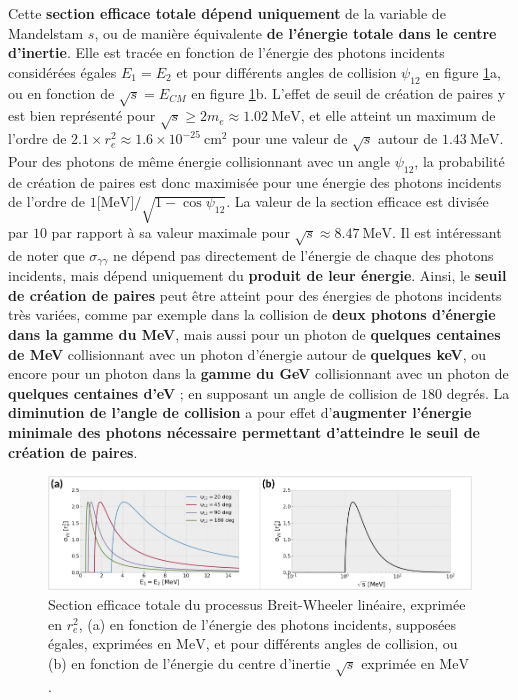 \begin{refsection}
Cette \textbf{section efficace totale dépend uniquement} de la variable de Mandelstam $s$, ou de manière équivalente \textbf{de l'énergie totale dans le centre d'inertie}. Elle est tracée en fonction de l'énergie des photons incidents considérées égales $E_1=E_2$ et pour différents angles de collision $\psi_{12}$ en figure \ref{fig:1-sigma_BWL}a, ou en fonction de $\sqrt{s}=E_{CM}$ en figure \ref{fig:1-sigma_BWL}b. L'effet de seuil de création de paires y est bien représenté pour $\sqrt{s}\ge 2 m_e \approx 1.02 ~ \si{\MeV}$, et elle atteint un maximum de l'ordre de  $2.1 \times r_e^2 \approx 1.6 \times 10^{-25} ~ \si{\cm^2}$ pour une valeur de $\sqrt{s}$ autour de $1.43 ~ \si{\MeV}$. Pour des photons de même énergie collisionnant avec un angle $\psi_{12}$, la probabilité de création de paires est donc maximisée pour une énergie des photons incidents de l'ordre de $1 \si{[\MeV]}/\sqrt{1-\cos{\psi_{12}}}$. La valeur de la section efficace est divisée par $10$ par rapport à sa valeur maximale pour $\sqrt{s} \approx 8.47 ~ \si{\MeV}$. Il est intéressant de noter que $\sigma_{\gamma\gamma}$ ne dépend pas directement de l'énergie de chaque des photons incidents, mais dépend uniquement du \textbf{produit de leur énergie}. Ainsi, le \textbf{seuil de création de paires} peut être atteint pour des énergies de photons incidents très variées, comme par exemple dans la collision de \textbf{deux photons d'énergie dans la gamme du MeV}, mais aussi pour un photon de \textbf{quelques centaines de MeV} collisionnant avec un photon d'énergie autour de \textbf{quelques keV}, ou encore pour un photon dans la \textbf{gamme du GeV} collisionnant avec un photon de \textbf{quelques centaines d'eV} ; en supposant un angle de collision de $180$ degrés. La \textbf{diminution de l'angle de collision} a pour effet d'\textbf{augmenter l'énergie minimale des photons nécessaire permettant d'atteindre le seuil de création de paires}.

\begin{figure}[hbtp]
	\centering
	\includegraphics[width=\linewidth]{1-particules/sigma_BWL.png}
	\caption{Section efficace totale du processus Breit-Wheeler linéaire, exprimée en $r_e^2$, (a) en fonction de l'énergie des photons incidents, supposées égales, exprimées en $\si{\MeV}$, et pour différents angles de collision, ou (b) en fonction de l'énergie du centre d'inertie $\sqrt{s}$ exprimée en $\si{\MeV}$.}
	\label{fig:1-sigma_BWL}
\end{figure}


\end{refsection}
